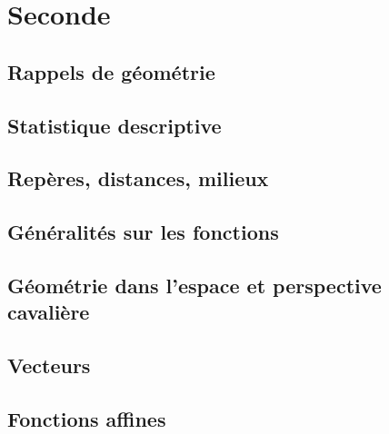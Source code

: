 \documentclass[a4paper,12pt]{book}
\begin{document}



\newpage



\tableofcontents

\newpage

\part{Seconde}

\setcounter{chapter}{-1}

\chapter{Rappels de géométrie}


\chapter{Statistique descriptive}


\chapter{Repères, distances, milieux}


\chapter{Généralités sur les fonctions}


\chapter{Géométrie dans l'espace et perspective cavalière}


\chapter{Vecteurs}


\chapter{Fonctions affines}

\end{document}
